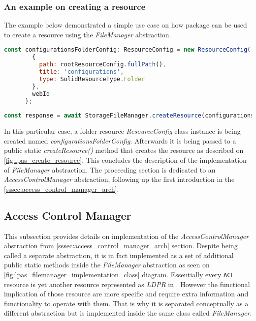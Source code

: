 \subsubsection{An example on creating a resource}

The example below demonstrated a simple use case on how \lpas{} package can be used to create a \solid{} resource using the \textit{FileManager} abstraction. 

\begin{lstlisting}[language=javascript]
const configurationsFolderConfig: ResourceConfig = new ResourceConfig(
        {
          path: rootResourceConfig.fullPath(),
          title: 'configurations',
          type: SolidResourceType.Folder
        },
        webId
      );
      
const response = await StorageFileManager.createResource(configurationsFolderConfig)
\end{lstlisting}

In this particular case, a folder resource \textit{ResourceConfig} class instance is being created named \textit{configurationsFolderConfig}. Afterwards it is being passed to a public static \textit{createResource()} method that creates the resource as described on \autoref{fig:lpas_create_resource}. This concludes the description of the implementation of \textit{FileManager} abstraction. The proceeding section is dedicated to an \textit{AccessControlManager} abstraction, following up the first introduction in the \autoref{sssec:access_control_manager_arch}.


\subsection{Access Control Manager}
\label{sssec:access_control_manager_implementation}

This subsection provides details on implementation of the \textit{AccessControlManager} abstraction from \autoref{sssec:access_control_manager_arch} section. Despite being called a separate abstraction, it is in fact implemented as a set of additional public static methods inside the \textit{FileManager} abstraction as seen on \autoref{fig:lpas_filemanager_implementation_class} diagram. Essentially every \texttt{ACL} resource is yet another resource represented as \textit{LDPR} in \solid{}. However the functional implication of those resource are more specific and require extra information and functionality to operate with them. That is why it is separated conceptually as a different abstraction but is implemented inside the same class called \textit{FileManager}. 

